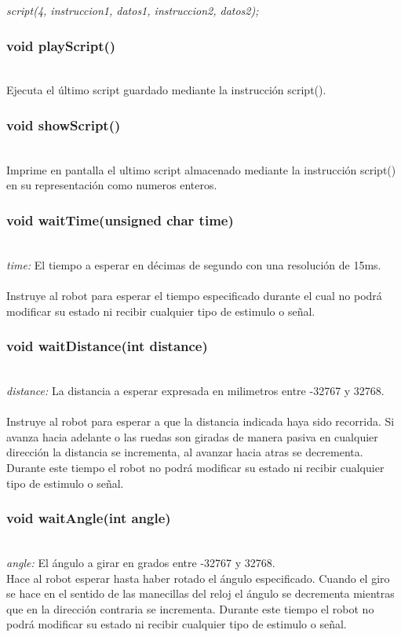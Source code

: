 \documentclass[letterpaper]{book}
\begin{document}
\emph{script(4, instruccion1, datos1, instruccion2, datos2);}

\subsubsection{void playScript()}\mbox{}\\
Ejecuta el último script guardado mediante la instrucción script().\\

\subsubsection{void showScript()}\mbox{}\\
Imprime en pantalla el ultimo script almacenado mediante la instrucción script() en su representación como numeros enteros.\\

\subsubsection{void waitTime(unsigned char time)}\mbox{}\\
\emph{time: } El tiempo a esperar en décimas de segundo con una resolución de 15ms.\\\\
Instruye al robot para esperar el tiempo especificado durante el cual no podrá modificar su estado ni recibir cualquier tipo de estimulo o señal.\\

\subsubsection{void waitDistance(int distance)}\mbox{}\\
\emph{distance: } La distancia a esperar expresada en milimetros entre -32767 y 32768.\\\\

Instruye al robot para esperar a que la distancia indicada haya sido recorrida. Si avanza hacia adelante o las ruedas son giradas de manera pasiva en cualquier dirección la distancia se incrementa, al avanzar hacia atras se decrementa. Durante este tiempo el robot no podrá  modificar su estado ni recibir cualquier tipo de estimulo o señal.\\

\subsubsection{void waitAngle(int angle)}\mbox{}\\
\emph{angle: } El ángulo a girar en grados entre -32767 y 32768.\\
Hace al robot esperar hasta haber rotado el ángulo especificado. Cuando el giro se hace en el sentido de las manecillas del reloj el ángulo  se decrementa mientras que en la dirección contraria se incrementa. Durante este tiempo el robot no podrá  modificar su estado ni recibir cualquier tipo de estimulo o señal.\\
\end{document}
